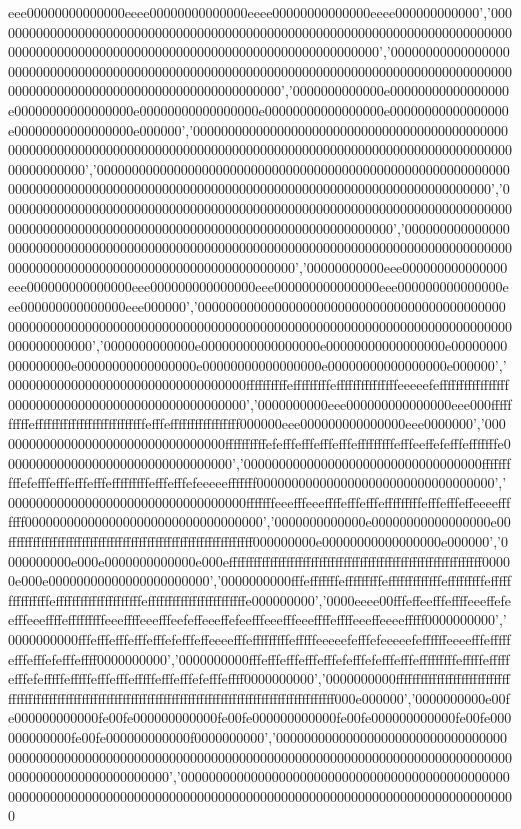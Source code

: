 eee00000000000000eeee00000000000000eeee00000000000000eeee000000000000','00000000000000000000000000000000000000000000000000000000000000000000000000000000000000000000000000000000000000000000000000000000','00000000000000000000000000000000000000000000000000000000000000000000000000000000000000000000000000000000000000000000000000000000','0000000000000e00000000000000000e00000000000000000e00000000000000000e00000000000000000e00000000000000000e00000000000000000e000000','00000000000000000000000000000000000000000000000000000000000000000000000000000000000000000000000000000000000000000000000000000000','00000000000000000000000000000000000000000000000000000000000000000000000000000000000000000000000000000000000000000000000000000000','00000000000000000000000000000000000000000000000000000000000000000000000000000000000000000000000000000000000000000000000000000000','00000000000000000000000000000000000000000000000000000000000000000000000000000000000000000000000000000000000000000000000000000000','00000000000eee000000000000000eee000000000000000eee000000000000000eee000000000000000eee000000000000000eee000000000000000eee000000','00000000000000000000000000000000000000000000000000000000000000000000000000000000000000000000000000000000000000000000000000000000','0000000000000e00000000000000000e00000000000000000e00000000000000000e00000000000000000e00000000000000000e00000000000000000e000000','0000000000000000000000000000000000ffffffffffefffffffffefffffffffffffffeeeeefefffffffffffffffff0000000000000000000000000000000000','0000000000eee000000000000000eee000ffffffffffefffffffffffffffffffffffffffefffefffffffffffffffff000000eee000000000000000eee0000000','0000000000000000000000000000000000ffffffffffefefffefffefffefffefffffffffefffeeffefefffefffffffe000000000000000000000000000000000','0000000000000000000000000000000000ffffffffffefefffefffefffefffefffffffffefffefffefeeeeefffffff0000000000000000000000000000000000','0000000000000000000000000000000000fffffffeeefffeeeffffefffefffefffffffffefffefffeffeeeefffffff0000000000000000000000000000000000','0000000000000e00000000000000000e00ffffffffffffffffffffffffffffffffffffffffffffffffffffffffffff000000000e00000000000000000e000000','0000000000e000e0000000000000e000effffffffffffffffffffffffffffffffffffffffffffffffffffffffffffff00000e000e00000000000000000000000','0000000000fffefffffffefffffffffefffffffffffffefffffffffefffffffffffffffefffffffffffffffffffffeffffffffffffffffffffffffe000000000','0000eeee00fffeffeefffeffffeeeffefeefffeeeffffefffffffffeeeffffeeefffeefeffeeeffefeefffeeefffeeeffffeffffeeeffeeeefffff0000000000','0000000000fffefffefffefffefffefefffeffeeeefffefffffffffefffffeeeeefefffefeeeeefeffffffeeeefffefffffefffefffefefffeffff0000000000','0000000000fffefffefffefffefffefefffefefffefffefffffffffefffffefffffefffefefffffefffffefffefffefffffefffefffefefffeffff0000000000','0000000000ffffffffffffffffffffffffffffffffffffffffffffffffffffffffffffffffffffffffffffffffffffffffffffffffffffffffffff000e000000','0000000000e00fe000000000000fe00fe000000000000fe00fe000000000000fe00fe000000000000fe00fe000000000000fe00fe000000000000f0000000000','00000000000000000000000000000000000000000000000000000000000000000000000000000000000000000000000000000000000000000000000000000000','000000000000000000000000000000000000000000000000000000000000000000000000000000000000000000000000000000000000000000000000
